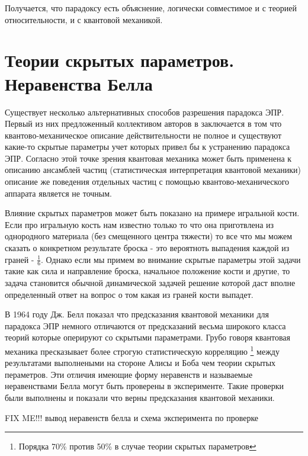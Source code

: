 Получается, что парадоксу есть объяснение, логически совместимое и с теорией относительности, и с квантовой механикой.

\section{Теории скрытых параметров. Неравенства Белла}
Существует несколько альтернативных способов разрешения парадокса ЭПР. Первый из них предложенный коллективом авторов в 
\cite{bEPR} заключается в том что квантово-механическое описание действительности не полное и существуют 
какие-то скрытые параметры учет которых привел бы к устранению парадокса ЭПР. Согласно этой точке зрения 
квантовая механика может быть применена к описанию ансамблей частиц (статистическая интерпретация квантовой механики)
описание же поведения отдельных частиц с помощью квантово-механического аппарата является не точным. 

Влияние скрытых параметров может быть показано на примере игральной кости. Если про игральную кость нам известно только 
то что она приготвлена из однородного материала (без смещенного центра тяжести) то все что мы можем сказать о конкретном 
результате броска - это вероятноть выпадения каждой из граней - $\frac{1}{6}$. Однако если мы примем во внимание 
скрытые параметры этой задачи такие как сила и направление броска, начальное положение кости и другие, то задача становится
обычной динамической задачей решение которой даст вполне определенный ответ на вопрос о том какая из граней кости выпадет.

В 1964 году Дж. Белл показал \cite{bBell} что предсказания квантовой механики для парадокса ЭПР немного отличаются от 
предсказаний весьма широкого класса теорий которые оперируют со скрытыми параметрами. Грубо говоря квантовая механика 
пресказывает более строгую статистическую корреляцию \footnote{Порядка 70\% против 50\% в случае теории скрытых параметров}
между результатами выполнеными на стороне Алисы и Боба чем 
теории скрытых пераметров. Эти отличия имеющие форму неравенств и называемые неравенствами Белла могут быть проверены 
в эксперименте. Такие проверки были выполнены \cite{bBellTest} и показали что верны предсказания квантовой механики. 

FIX ME!!! вывод неравенств белла и схема эксперимента по проверке



